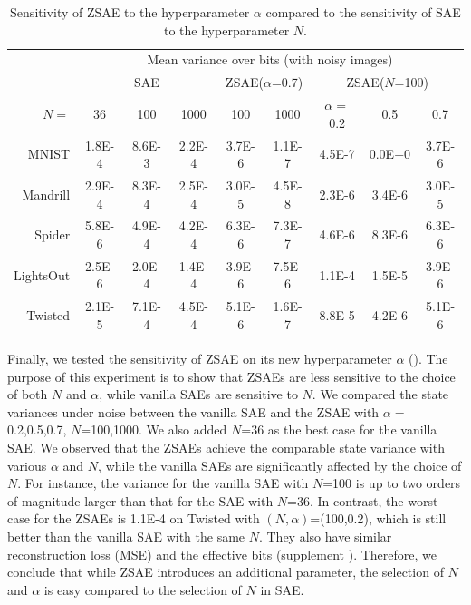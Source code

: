 \begin{table}[tb]
 \centering
 \setlength{\tabcolsep}{0.25em}
 \begin{tabular}{|r|*{8}{c|}}
     & \multicolumn{8}{c|}{Mean variance over bits (with noisy images)} \\
     & \multicolumn{3}{c|}{SAE} 
     & \multicolumn{2}{c|}{ZSAE($\alpha$=0.7)} 
     & \multicolumn{3}{c|}{ZSAE($N$=100)}
  \\
$N=$      &36     & 100    & 1000   & 100    & 1000   & $\alpha=$0.2 & 0.5    & 0.7    \\
MNIST     &1.8E-4 & 8.6E-3 & 2.2E-4 & 3.7E-6 & 1.1E-7 & 4.5E-7       & 0.0E+0 & 3.7E-6 \\
Mandrill  &2.9E-4 & 8.3E-4 & 2.5E-4 & 3.0E-5 & 4.5E-8 & 2.3E-6       & 3.4E-6 & 3.0E-5 \\
Spider    &5.8E-6 & 4.9E-4 & 4.2E-4 & 6.3E-6 & 7.3E-7 & 4.6E-6       & 8.3E-6 & 6.3E-6 \\
LightsOut &2.5E-6 & 2.0E-4 & 1.4E-4 & 3.9E-6 & 7.5E-6 & 1.1E-4       & 1.5E-5 & 3.9E-6 \\
Twisted   &2.1E-5 & 7.1E-4 & 4.5E-4 & 5.1E-6 & 1.6E-7 & 8.8E-5       & 4.2E-6 & 5.1E-6 \\
\end{tabular}
 \caption{Sensitivity of ZSAE to the hyperparameter $\alpha$ compared to the sensitivity of SAE to the hyperparameter $N$.}
 \label{sensitivity}
\end{table}

Finally, we tested the sensitivity of ZSAE on its new hyperparameter $\alpha$ ().
The purpose of this experiment is to show that ZSAEs are less sensitive to the choice of both $N$ and $\alpha$,
while vanilla SAEs are sensitive to $N$.
% 
We compared the state variances under noise
between the vanilla SAE and the ZSAE with $\alpha=$0.2,0.5,0.7, $N$=100,1000.
We also added $N$=36 as the best case for the vanilla SAE.
% 
We observed that the ZSAEs achieve the comparable state variance with various $\alpha$ and $N$,
while the vanilla SAEs are significantly affected by the choice of $N$.
For instance,
the variance for the vanilla SAE with $N$=100 is up to two orders of magnitude larger than that for the SAE with $N$=36.
In contrast,
the worst case for the ZSAEs is 1.1E-4 on Twisted with $(N,\alpha)$=(100,0.2),
which is still better than the vanilla SAE with the same $N$.
% 
They also have similar reconstruction loss (MSE) and the effective bits (supplement ).
Therefore, we conclude that while ZSAE introduces an additional parameter,
the selection of $N$ and $\alpha$ is easy compared to the selection of $N$ in SAE.


